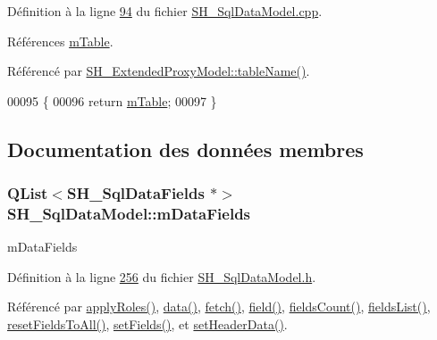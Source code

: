 Définition à la ligne \hyperlink{SH__SqlDataModel_8cpp_source_l00094}{94} du fichier \hyperlink{SH__SqlDataModel_8cpp_source}{S\-H\-\_\-\-Sql\-Data\-Model.\-cpp}.



Références \hyperlink{classSH__SqlDataModel_a88b8738a0d2803c94295c90c83d65f32}{m\-Table}.



Référencé par \hyperlink{classSH__ExtendedProxyModel_abb133e196ca7cf90b9c9b57263e898d6}{S\-H\-\_\-\-Extended\-Proxy\-Model\-::table\-Name()}.


\begin{DoxyCode}
00095 \{
00096     \textcolor{keywordflow}{return} \hyperlink{classSH__SqlDataModel_a88b8738a0d2803c94295c90c83d65f32}{mTable};
00097 \}
\end{DoxyCode}


\subsection{Documentation des données membres}
\hypertarget{classSH__SqlDataModel_a3e998f75dd5b3193783612002461888d}{
\subsubsection[{m\-Data\-Fields}]{\setlength{\rightskip}{0pt plus 5cm}Q\-List$<${\bf S\-H\-\_\-\-Sql\-Data\-Fields} $\ast$$>$ S\-H\-\_\-\-Sql\-Data\-Model\-::m\-Data\-Fields\hspace{0.3cm}{\ttfamily [private]}}}\label{classSH__SqlDataModel_a3e998f75dd5b3193783612002461888d}


m\-Data\-Fields 



Définition à la ligne \hyperlink{SH__SqlDataModel_8h_source_l00256}{256} du fichier \hyperlink{SH__SqlDataModel_8h_source}{S\-H\-\_\-\-Sql\-Data\-Model.\-h}.



Référencé par \hyperlink{classSH__SqlDataModel_ad4f032ceb7c2f70b2d7388e3afd161ab}{apply\-Roles()}, \hyperlink{classSH__SqlDataModel_aa4664329d52c2d2cba2bacc42fa1a564}{data()}, \hyperlink{classSH__SqlDataModel_ab6c206088250a66ddc8cb8d33a38e421}{fetch()}, \hyperlink{classSH__SqlDataModel_a92c51d5c1f6aca08a7ee566ece1e4cb6}{field()}, \hyperlink{classSH__SqlDataModel_a46f0951fd358e30892a982ebd34e43c2}{fields\-Count()}, \hyperlink{classSH__SqlDataModel_a571bdc1f9592bd13f98fd748563d46c0}{fields\-List()}, \hyperlink{classSH__SqlDataModel_ad0477d16e78ba808250e2054952f9833}{reset\-Fields\-To\-All()}, \hyperlink{classSH__SqlDataModel_ad297d359375d55e66493ce8935f8ff05}{set\-Fields()}, et \hyperlink{classSH__SqlDataModel_aae31b72ec89a35a7b8d4175d7bcaa33a}{set\-Header\-Data()}.

